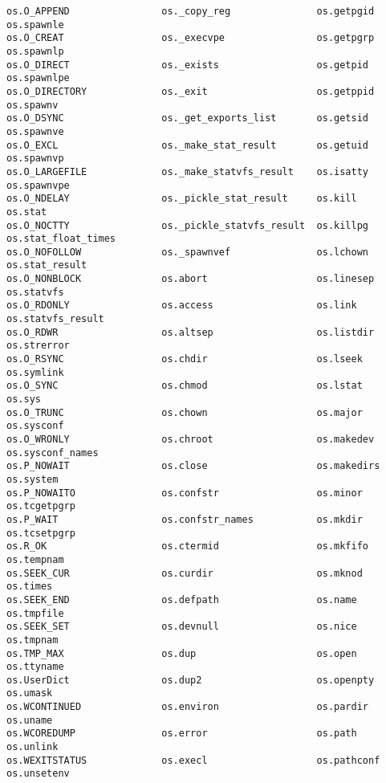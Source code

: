 \begin{verbatim}
os.O_APPEND                os._copy_reg               os.getpgid                 os.spawnle
os.O_CREAT                 os._execvpe                os.getpgrp                 os.spawnlp
os.O_DIRECT                os._exists                 os.getpid                  os.spawnlpe
os.O_DIRECTORY             os._exit                   os.getppid                 os.spawnv
os.O_DSYNC                 os._get_exports_list       os.getsid                  os.spawnve
os.O_EXCL                  os._make_stat_result       os.getuid                  os.spawnvp
os.O_LARGEFILE             os._make_statvfs_result    os.isatty                  os.spawnvpe
os.O_NDELAY                os._pickle_stat_result     os.kill                    os.stat
os.O_NOCTTY                os._pickle_statvfs_result  os.killpg                  os.stat_float_times
os.O_NOFOLLOW              os._spawnvef               os.lchown                  os.stat_result
os.O_NONBLOCK              os.abort                   os.linesep                 os.statvfs
os.O_RDONLY                os.access                  os.link                    os.statvfs_result
os.O_RDWR                  os.altsep                  os.listdir                 os.strerror
os.O_RSYNC                 os.chdir                   os.lseek                   os.symlink
os.O_SYNC                  os.chmod                   os.lstat                   os.sys
os.O_TRUNC                 os.chown                   os.major                   os.sysconf
os.O_WRONLY                os.chroot                  os.makedev                 os.sysconf_names
os.P_NOWAIT                os.close                   os.makedirs                os.system
os.P_NOWAITO               os.confstr                 os.minor                   os.tcgetpgrp
os.P_WAIT                  os.confstr_names           os.mkdir                   os.tcsetpgrp
os.R_OK                    os.ctermid                 os.mkfifo                  os.tempnam
os.SEEK_CUR                os.curdir                  os.mknod                   os.times
os.SEEK_END                os.defpath                 os.name                    os.tmpfile
os.SEEK_SET                os.devnull                 os.nice                    os.tmpnam
os.TMP_MAX                 os.dup                     os.open                    os.ttyname
os.UserDict                os.dup2                    os.openpty                 os.umask
os.WCONTINUED              os.environ                 os.pardir                  os.uname
os.WCOREDUMP               os.error                   os.path                    os.unlink
os.WEXITSTATUS             os.execl                   os.pathconf                os.unsetenv

\end{verbatim}
